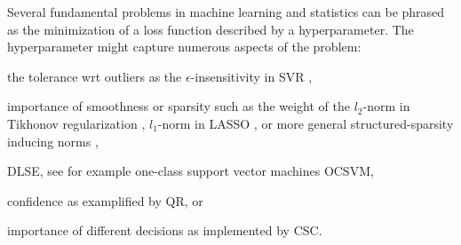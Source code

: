 %
%
%
%
%
%

Several fundamental problems in machine learning and statistics can be phrased
as the minimization of a loss function described by a hyperparameter.
The hyperparameter might capture numerous aspects of the problem:
\begin{inparaenum}[(i)]
    \item the tolerance \acs{wrt} outliers as the  $\epsilon$-insensitivity in
    \ac{SVR} \citep{vapnik1997support},
    \item importance of smoothness or sparsity such as the weight of the
    $l_2$-norm in Tikhonov regularization \citep{tikhonov77solution},
    $l_1$-norm in \acs{LASSO} \citep{tibshirani1996regression}, or more general
    structured-sparsity inducing norms \citep{bach12optimization},
    \item \ac{DLSE}, see for example one-class support vector machines
    \ac{OCSVM},
    \item confidence as examplified by \ac{QR}, or
    \item importance of different decisions as implemented by \ac{CSC}.
\end{inparaenum}




